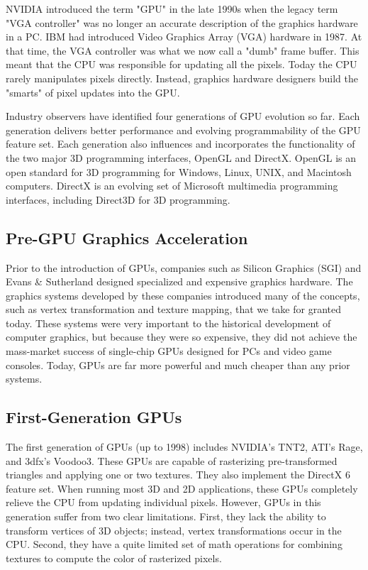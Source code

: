 \documentclass{book}
\begin{document}
NVIDIA introduced the term "GPU" in the late 1990s when the legacy term "VGA controller" was no longer an accurate description of the graphics hardware in a PC. IBM had introduced Video Graphics Array (VGA) hardware in 1987. At that time, the VGA controller was what we now call a "dumb" frame buffer. This meant that the CPU was responsible for updating all the pixels. Today the CPU rarely manipulates pixels directly. Instead, graphics hardware designers build the "smarts" of pixel updates into the GPU.

Industry observers have identified four generations of GPU evolution so far. Each generation delivers better performance and evolving programmability of the GPU feature set. Each generation also influences and incorporates the functionality of the two major 3D programming interfaces, OpenGL and DirectX. OpenGL is an open standard for 3D programming for Windows, Linux, UNIX, and Macintosh computers. DirectX is an evolving set of Microsoft multimedia programming interfaces, including Direct3D for 3D programming.

\subsection*{Pre-GPU Graphics Acceleration}

Prior to the introduction of GPUs, companies such as Silicon Graphics (SGI) and Evans \& Sutherland designed specialized and expensive graphics hardware. The graphics systems developed by these companies introduced many of the concepts, such as vertex transformation and texture mapping, that we take for granted today. These systems were very important to the historical development of computer graphics, but because they were so expensive, they did not achieve the mass-market success of single-chip GPUs designed for PCs and video game consoles. Today, GPUs are far more powerful and much cheaper than any prior systems.

\subsection*{First-Generation GPUs}

The first generation of GPUs (up to 1998) includes NVIDIA's TNT2, ATI's Rage, and 3dfx's Voodoo3. These GPUs are capable of rasterizing pre-transformed triangles and applying one or two textures. They also implement the DirectX 6 feature set. When running most 3D and 2D applications, these GPUs completely relieve the CPU from updating individual pixels. However, GPUs in this generation suffer from two clear limitations. First, they lack the ability to transform vertices of 3D objects; instead, vertex transformations occur in the CPU. Second, they have a quite limited set of math operations for combining textures to compute the color of rasterized pixels.
\end{document}
